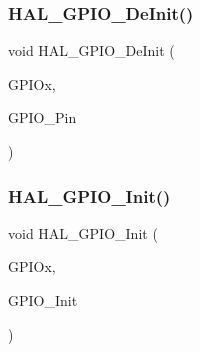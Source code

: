 \subsubsection{\texorpdfstring{H\+A\+L\+\_\+\+G\+P\+I\+O\+\_\+\+De\+Init()}{HAL\_GPIO\_DeInit()}}
{\footnotesize\ttfamily void H\+A\+L\+\_\+\+G\+P\+I\+O\+\_\+\+De\+Init (\begin{DoxyParamCaption}\item[{\hyperlink{struct_g_p_i_o___type_def}{G\+P\+I\+O\+\_\+\+Type\+Def} $\ast$}]{G\+P\+I\+Ox,  }\item[{uint32\+\_\+t}]{G\+P\+I\+O\+\_\+\+Pin }\end{DoxyParamCaption})}

\mbox{\label{group___g_p_i_o___exported___functions___group1_ga41bda93b6dd639e4905fdb1454eff98e}} 
\subsubsection{\texorpdfstring{H\+A\+L\+\_\+\+G\+P\+I\+O\+\_\+\+Init()}{HAL\_GPIO\_Init()}}
{\footnotesize\ttfamily void H\+A\+L\+\_\+\+G\+P\+I\+O\+\_\+\+Init (\begin{DoxyParamCaption}\item[{\hyperlink{struct_g_p_i_o___type_def}{G\+P\+I\+O\+\_\+\+Type\+Def} $\ast$}]{G\+P\+I\+Ox,  }\item[{\hyperlink{struct_g_p_i_o___init_type_def}{G\+P\+I\+O\+\_\+\+Init\+Type\+Def} $\ast$}]{G\+P\+I\+O\+\_\+\+Init }\end{DoxyParamCaption})}

